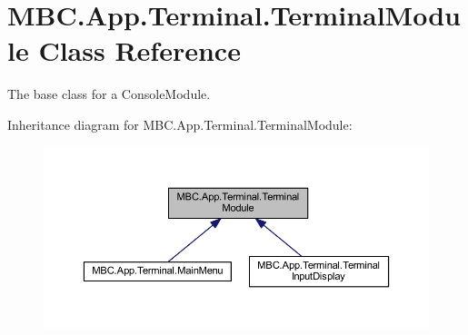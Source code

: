 \hypertarget{class_m_b_c_1_1_app_1_1_terminal_1_1_terminal_module}{\section{M\-B\-C.\-App.\-Terminal.\-Terminal\-Module Class Reference}
\label{class_m_b_c_1_1_app_1_1_terminal_1_1_terminal_module}
}


The base class for a Console\-Module. 




Inheritance diagram for M\-B\-C.\-App.\-Terminal.\-Terminal\-Module\-:
\nopagebreak
\begin{figure}[H]
\begin{center}
\leavevmode
\includegraphics[width=350pt]{class_m_b_c_1_1_app_1_1_terminal_1_1_terminal_module__inherit__graph}
\end{center}
\end{figure}
